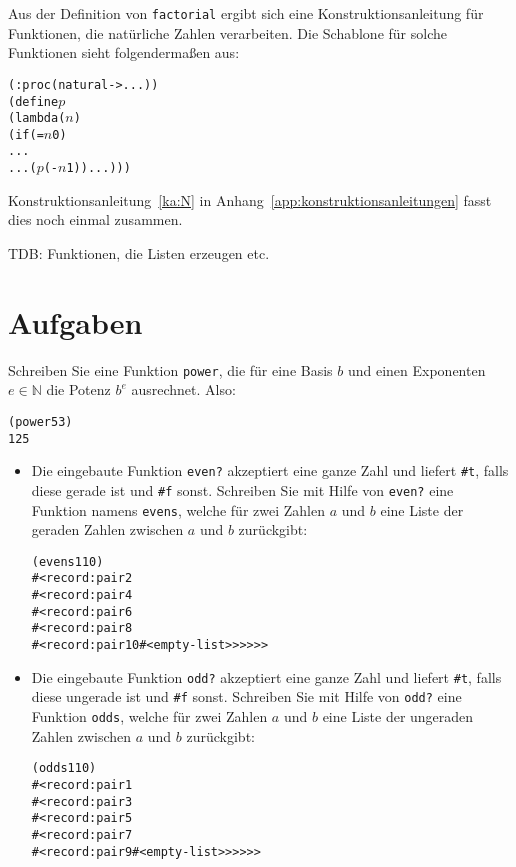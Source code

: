 Aus der Definition von \texttt{factorial} ergibt sich eine
Konstruktionsanleitung für Funktionen, die natürliche Zahlen
verarbeiten.  Die Schablone für solche Funktionen sieht folgendermaßen aus:
%
\begin{alltt}
(: proc (natural -> ...))
(define \(p\)
  (lambda (\(n\))
    (if (= \(n\) 0)
        ...
        ... (\(p\) (- \(n\) 1)) ...)))
\end{alltt}
\label{sec:ka-recursion-numbers}
%
Konstruktionsanleitung~\ref{ka:N} in
Anhang~\ref{app:konstruktionsanleitungen} fasst dies noch einmal
zusammen.

TDB: Funktionen, die Listen erzeugen etc.

\section*{Aufgaben}

\begin{aufgabe}\label{aufg:power}
  Schreiben Sie eine Funktion \texttt{power}, die für eine Basis $b$ und
  einen Exponenten $e\in\mathbb{N}$ die Potenz $b^e$ ausrechnet.  Also:
\begin{alltt}
(power 5 3)
\evalsto{} 125
\end{alltt}
  \end{aufgabe}

\begin{aufgabe}\label{ex:evensodds}
  \begin{itemize}
  \item
    Die eingebaute Funktion \texttt{even?}
    akzeptiert eine ganze Zahl und liefert \verb|#t|, falls diese
    gerade ist und \verb|#f| sonst.
    Schreiben Sie mit Hilfe von \texttt{even?}
    eine Funktion namens \texttt{evens}, welche für zwei
    Zahlen $a$ und $b$ eine Liste der geraden Zahlen zwischen $a$ und
    $b$ zurückgibt:
\begin{alltt}
(evens 1 10)
\evalsto{} #<record:pair 2
     #<record:pair 4
       #<record:pair 6
         #<record:pair 8
           #<record:pair 10 #<empty-list>>>>>>
\end{alltt}
  \item
    Die eingebaute Funktion \texttt{odd?}
    akzeptiert eine ganze Zahl und liefert \verb|#t|, falls diese
    ungerade ist und \verb|#f| sonst.
    Schreiben Sie mit Hilfe von \texttt{odd?} eine Funktion \texttt{odds}, welche für zwei
    Zahlen $a$ und $b$ eine Liste der ungeraden Zahlen zwischen $a$ und $b$
    zurückgibt:
\begin{alltt}
(odds 1 10)
\evalsto{} #<record:pair 1
     #<record:pair 3
       #<record:pair 5
         #<record:pair 7
           #<record:pair 9 #<empty-list>>>>>>
\end{alltt}
  \end{itemize}
\end{aufgabe}

